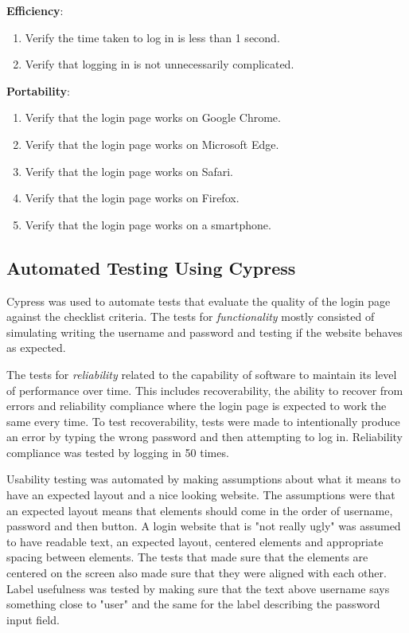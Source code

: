 \documentclass[journal,twocolumn]{IEEEtran}
\begin{document}
\textbf{Efficiency}:

\begin{enumerate}[label=4.\arabic*]
    \item Verify the time taken to log in is less than 1 second.
    \item Verify that logging in is not unnecessarily complicated.
\end{enumerate}

\textbf{Portability}:
\begin{enumerate}[label=5.\arabic*]
    \item Verify that the login page works on Google Chrome.
    \item Verify that the login page works on Microsoft Edge.
    \item Verify that the login page works on Safari.
    \item Verify that the login page works on Firefox.
    \item Verify that the login page works on a smartphone.
\end{enumerate}

\subsection{Automated Testing Using Cypress}
Cypress was used to automate tests that evaluate the quality of the login page against the checklist criteria. The tests for \textit{functionality} mostly consisted of simulating writing the username and password and testing if the website behaves as expected.

The tests for \textit{reliability} related to the capability of software to maintain its level of performance over time. This includes recoverability, the ability to recover from errors and reliability compliance where the login page is expected to work the same every time. To test recoverability, tests were made to intentionally produce an error by typing the wrong password and then attempting to log in. Reliability compliance was tested by logging in 50 times.

Usability testing was automated by making assumptions about what it means to have an expected layout and a nice looking website. The assumptions were that an expected layout means that elements should come in the order of username, password and then button. A login website that is "not really ugly" was assumed to have readable text, an expected layout, centered elements and appropriate spacing between elements. The tests that made sure that the elements are centered on the screen also made sure that they were aligned with each other. Label usefulness was tested by making sure that the text above username says something close to "user" and the same for the label describing the password input field.
\end{document}
